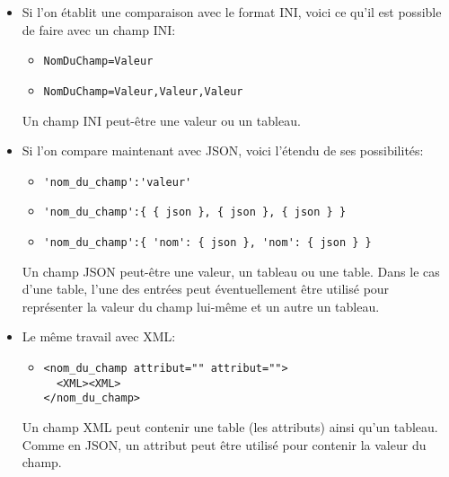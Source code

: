 \documentclass[a5paper, 12pt]{book}
\begin{document}
\begin{itemize}
  \item Si l'on établit une comparaison avec le format INI, voici
    ce qu'il est possible de faire avec un champ INI:\\
    \begin{itemize}
      \item \verb!NomDuChamp=Valeur!
      \item \verb!NomDuChamp=Valeur,Valeur,Valeur!
    \end{itemize}
    \vspace{\baselineskip}
    Un champ INI peut-être une valeur ou un tableau.\\

  \item Si l'on compare maintenant avec JSON, voici l'étendu de ses
    possibilités:
    \begin{itemize}
      \item \verb!'nom_du_champ':'valeur'!
      \item \verb!'nom_du_champ':{ { json }, { json }, { json } }!
      \item \verb!'nom_du_champ':{ 'nom': { json }, 'nom': { json } }!
    \end{itemize}
    \vspace{\baselineskip}
    Un champ JSON peut-être une valeur, un tableau ou une table.
    Dans le cas d'une table, l'une des entrées peut éventuellement être utilisé
    pour représenter la valeur du champ lui-même et un autre un tableau.\\

  \item Le même travail avec XML:
    \begin{itemize}
      \item \begin{verbatim}
<nom_du_champ attribut="" attribut="">
  <XML><XML>
</nom_du_champ>
\end{verbatim}
    \end{itemize}
    \vspace{\baselineskip}
    Un champ XML peut contenir une table (les attributs) ainsi qu'un tableau.
    Comme en JSON, un attribut peut être utilisé pour contenir la valeur du champ.\\


\end{itemize}
\end{document}
